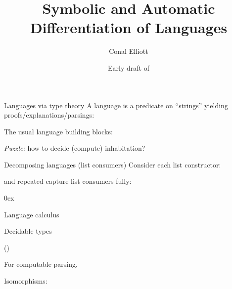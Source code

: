 \documentclass[aspectratio=169]{beamer}
\title{Symbolic and Automatic Differentiation of Languages}
\author{Conal Elliott}
\date{Early draft of \DTMnow}
\begin{document}
\begin{center}
\maketitle
{}
\end{center}

\rnc{}

\begin{frame}{Languages via type theory}
\vspace{1.5ex}
A language is a predicate on ``strings'' yielding proofs/explanations/parsings:
\vspace{1ex}

The usual language building blocks:
\vspace{-2ex}


\vspace{-1ex}
\emph{Puzzle:} how to decide (compute) inhabitation?
\end{frame}

\rnc{}

\begin{frame}{Decomposing languages (list consumers)}
\vspace{2ex}
Consider each list constructor:
\vspace{1.5ex}

\vspace{2ex}
 and repeated  capture list consumers fully:

\vspace{-1ex}
\begin{minipage}[c]{2.8in}
\end{minipage}
\hfill
\begin{minipage}[c]{2.5in}
\mathindent0ex
\end{minipage}
\hfill\;
\end{frame}

\begin{frame}{Language calculus}
\vspace{-1ex}
\vfill
{}
\end{frame}

\rnc{}

\begin{frame}{Decidable types}
\begin{minipage}{2in}
\end{minipage}
\hfill
\begin{minipage}{2in}
\vspace{6.3ex}
()
\end{minipage}
\hfill\;

For computable parsing,

Isomorphisms:

\end{frame}
\end{document}
